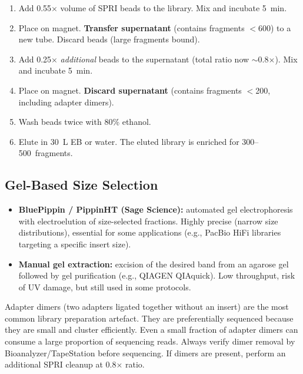 \begin{protocolbox}[title={Double-Sided SPRI Size Selection (Target: 300--500\,bp)}]
\begin{enumerate}[nosep]
  \item Add 0.55$\times$ volume of SPRI beads to the library. Mix and incubate 5~min.
  \item Place on magnet. \textbf{Transfer supernatant} (contains fragments $<$600\basepair) to a new tube. Discard beads (large fragments bound).
  \item Add 0.25$\times$ \emph{additional} beads to the supernatant (total ratio now ${\sim}$0.8$\times$). Mix and incubate 5~min.
  \item Place on magnet. \textbf{Discard supernatant} (contains fragments $<$200\basepair, including adapter dimers).
  \item Wash beads twice with 80\% ethanol.
  \item Elute in 30~\textmu L EB or water. The eluted library is enriched for 300--500\basepair\ fragments.
\end{enumerate}
\end{protocolbox}

\subsection{Gel-Based Size Selection}

\begin{itemize}[nosep]
  \item \textbf{BluePippin / PippinHT (Sage Science):} automated gel electrophoresis with electroelution of size-selected fractions. Highly precise (narrow size distributions), essential for some applications (e.g., PacBio HiFi libraries targeting a specific insert size).
  \item \textbf{Manual gel extraction:} excision of the desired band from an agarose gel followed by gel purification (e.g., QIAGEN QIAquick). Low throughput, risk of UV damage, but still used in some protocols.
\end{itemize}

\begin{warningbox}[title={Adapter Dimers}]
Adapter dimers (two adapters ligated together without an insert) are the most common library preparation artefact. They are preferentially sequenced because they are small and cluster efficiently. Even a small fraction of adapter dimers can consume a large proportion of sequencing reads. Always verify dimer removal by Bioanalyzer/TapeStation before sequencing. If dimers are present, perform an additional SPRI cleanup at 0.8$\times$ ratio.
\end{warningbox}


